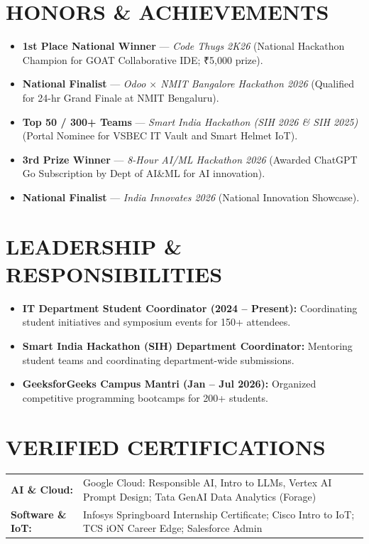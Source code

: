\documentclass[a4paper,10pt]{article}
\begin{document}
\section{HONORS \& ACHIEVEMENTS}
\begin{itemize}
    \item \textbf{1st Place National Winner} --- \textit{Code Thugs 2K26} (National Hackathon Champion for GOAT Collaborative IDE; ₹5,000 prize).
    \item \textbf{National Finalist} --- \textit{Odoo $\times$ NMIT Bangalore Hackathon 2026} (Qualified for 24-hr Grand Finale at NMIT Bengaluru).
    \item \textbf{Top 50 / 300+ Teams} --- \textit{Smart India Hackathon (SIH 2026 \& SIH 2025)} (Portal Nominee for VSBEC IT Vault and Smart Helmet IoT).
    \item \textbf{3rd Prize Winner} --- \textit{8-Hour AI/ML Hackathon 2026} (Awarded ChatGPT Go Subscription by Dept of AI\&ML for AI innovation).
    \item \textbf{National Finalist} --- \textit{India Innovates 2026} (National Innovation Showcase).
\end{itemize}

\section{LEADERSHIP \& RESPONSIBILITIES}
\begin{itemize}
    \item \textbf{IT Department Student Coordinator (2024 -- Present):} Coordinating student initiatives and symposium events for 150+ attendees.
    \item \textbf{Smart India Hackathon (SIH) Department Coordinator:} Mentoring student teams and coordinating department-wide submissions.
    \item \textbf{GeeksforGeeks Campus Mantri (Jan -- Jul 2026):} Organized competitive programming bootcamps for 200+ students.
\end{itemize}

\section{VERIFIED CERTIFICATIONS}
\begin{tabular}{@{}p{1.30in}p{6.10in}@{}}
\textbf{AI \& Cloud:} & Google Cloud: Responsible AI, Intro to LLMs, Vertex AI Prompt Design; Tata GenAI Data Analytics (Forage) \\
\textbf{Software \& IoT:} & Infosys Springboard Internship Certificate; Cisco Intro to IoT; TCS iON Career Edge; Salesforce Admin \\
\end{tabular}
\end{document}
